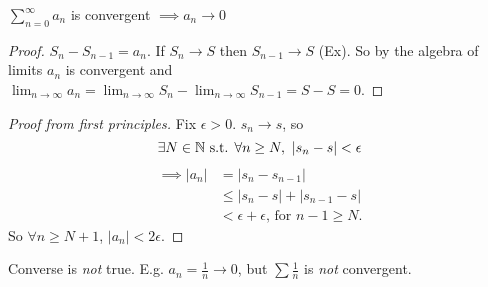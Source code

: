 \begin{theorem}
$\sum_{n=0}^\infty a_n$ is convergent $\implies a_n \to 0$	
\end{theorem}

\begin{proof}
$S_n - S_{n-1} = a_n$. If $S_n \to S$ then $S_{n-1} \to S$ (Ex). So by the algebra of limits $a_n$ is convergent and $\lim_{n\to \infty} a_n = \lim_{n\to\infty} S_n - \lim_{n\to \infty} S_{n-1} = S - S = 0$.	
\end{proof}

\begin{proof}[Proof from first principles]
Fix $\epsilon >0$. $s_n \to s$, so 
\[\exists N\in\mathbb{N} \text{ s.t. } \forall n \geq N,~|s_n - s| < \epsilon\]
\[\begin{aligned}
\implies |a_n| &= |s_n - s_{n-1}| \\
&\leq |s_n - s| + |s_{n-1} - s| \\ 
&< \epsilon + \epsilon \text{, for } n-1 \geq N.	
\end{aligned}
\]
So $\forall n \geq N+1$, $|a_n| < 2\epsilon$. 
\end{proof}\vspace*{5pt}

\begin{remark}
Converse is \emph{not} true. E.g. $a_n = \frac{1}{n} \to 0$, but $\sum \frac{1}{n}$ is \emph{not} convergent. 	
\end{remark}~

